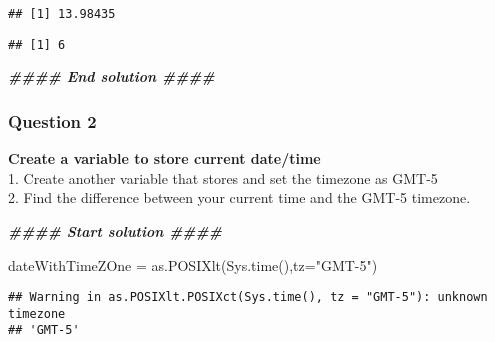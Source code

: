 \documentclass[
]{article}
\newenvironment{Shaded}{\begin{snugshade}}{\end{snugshade}}
\newcommand{\AttributeTok}[1]{\textcolor[rgb]{0.77,0.63,0.00}{#1}}
\newcommand{\DocumentationTok}[1]{\textcolor[rgb]{0.56,0.35,0.01}{\textbf{\textit{#1}}}}
\newcommand{\FunctionTok}[1]{\textcolor[rgb]{0.00,0.00,0.00}{#1}}
\newcommand{\NormalTok}[1]{#1}
\newcommand{\OtherTok}[1]{\textcolor[rgb]{0.56,0.35,0.01}{#1}}
\newcommand{\SpecialCharTok}[1]{\textcolor[rgb]{0.00,0.00,0.00}{#1}}
\newcommand{\StringTok}[1]{\textcolor[rgb]{0.31,0.60,0.02}{#1}}
\begin{document}
\begin{verbatim}
## [1] 13.98435
\end{verbatim}

\begin{Shaded}
\end{Shaded}

\begin{verbatim}
## [1] 6
\end{verbatim}

\begin{Shaded}
\begin{Highlighting}[]
\DocumentationTok{\#\#\#\# End solution \#\#\#\#}
\end{Highlighting}
\end{Shaded}

\hypertarget{question-2-3}{%
\subsubsection{Question 2}\label{question-2-3}}

\textbf{Create a variable to store current date/time}\\
1. Create another variable that stores and set the timezone as GMT-5\\
2. Find the difference between your current time and the GMT-5 timezone.

\begin{Shaded}
\begin{Highlighting}[]
\DocumentationTok{\#\#\#\# Start solution \#\#\#\#}
\end{Highlighting}
\end{Shaded}

\begin{Shaded}
\begin{Highlighting}[]
\NormalTok{dateWithTimeZOne }\OtherTok{=} \FunctionTok{as.POSIXlt}\NormalTok{(}\FunctionTok{Sys.time}\NormalTok{(),}\AttributeTok{tz=}\StringTok{"GMT{-}5"}\NormalTok{)}
\end{Highlighting}
\end{Shaded}

\begin{verbatim}
## Warning in as.POSIXlt.POSIXct(Sys.time(), tz = "GMT-5"): unknown timezone
## 'GMT-5'
\end{verbatim}
\end{document}
